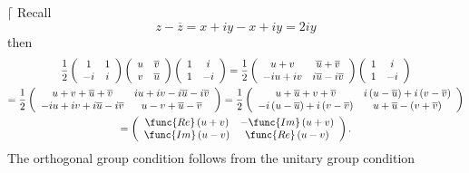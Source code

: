 \documentclass[aps,preprint]{revtex4}
\begin{document}
$\lceil $ Recall%
\begin{equation}
z-\overline{z}=x+iy-x+iy=2iy
\end{equation}%
then%
\begin{gather}
\frac{1}{2}\left( 
\begin{array}{cc}
1 & 1 \\ 
-i & i%
\end{array}%
\right) \left( 
\begin{array}{cc}
u & \overline{v} \\ 
v & \overline{u}%
\end{array}%
\right) \left( 
\begin{array}{cc}
1 & i \\ 
1 & -i%
\end{array}%
\right) =\frac{1}{2}\left( 
\begin{array}{cc}
u+v & \overline{u}+\overline{v} \\ 
-iu+iv & i\overline{u}-i\overline{v}%
\end{array}%
\right) \left( 
\begin{array}{cc}
1 & i \\ 
1 & -i%
\end{array}%
\right) \\
=\frac{1}{2}\left( 
\begin{array}{cc}
u+v+\overline{u}+\overline{v} & iu+iv-i\overline{u}-i\overline{v} \\ 
-iu+iv+i\overline{u}-i\overline{v} & u-v+\overline{u}-\overline{v}%
\end{array}%
\right) =\frac{1}{2}\left( 
\begin{array}{cc}
u+\overline{u}+v+\overline{v} & i\left( u-\overline{u}\right) +i\left( v-%
\overline{v}\right) \\ 
-i\left( u-\overline{u}\right) +i\left( v-\overline{v}\right) & u+\overline{u%
}-\left( v+\overline{v}\right)%
\end{array}%
\right) \\
=\left( 
\begin{array}{cc}
\func{Re}\left( u+v\right) & -\func{Im}\left( u+v\right) \\ 
\func{Im}\left( u-v\right) & \func{Re}\left( u-v\right)%
\end{array}%
\right) .
\end{gather}%
The orthogonal group condition follows from the unitary group condition%
\end{document}

